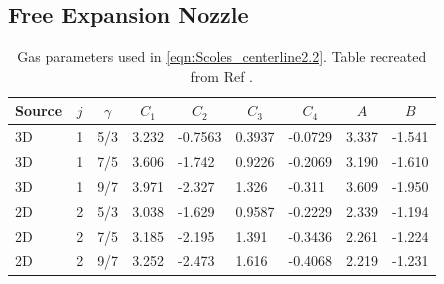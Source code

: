 \subsection{Free Expansion Nozzle}
%

\begin{table}[]
	\centering
	\begin{tabular}{lllllllll}
		\hline
		\multicolumn{1}{c}{Source} & \multicolumn{1}{c}{$j$} & \multicolumn{1}{c}{$\gamma$} & \multicolumn{1}{c}{$C_1$} & \multicolumn{1}{c}{$C_2$} & \multicolumn{1}{c}{$C_3$} & \multicolumn{1}{c}{$C_4$} & \multicolumn{1}{c}{$A$} & \multicolumn{1}{c}{$B$} \\ \hline
		3D                         & 1                     & 5/3                          & 3.232                     & -0.7563                   & 0.3937                    & -0.0729                   & 3.337                & -1.541                \\
		3D                         & 1                     & 7/5                          & 3.606                     & -1.742                    & 0.9226                    & -0.2069                   & 3.190                 & -1.610                \\
		3D                         & 1                     & 9/7                          & 3.971                     & -2.327                    & 1.326                     & -0.311                    & 3.609                 & -1.950                \\
		2D                         & 2                     & 5/3                          & 3.038                     & -1.629                    & 0.9587                    & -0.2229                   & 2.339                 & -1.194                \\
		2D                         & 2                     & 7/5                          & 3.185                     & -2.195                    & 1.391                     & -0.3436                   & 2.261                 & -1.224                \\
		2D                         & 2                     & 9/7                          & 3.252                     & -2.473                    & 1.616                     & -0.4068                   & 2.219                 & -1.231               
	\end{tabular}
	\caption{Gas parameters used in \cref{eqn:Scoles_centerline2.2}. Table recreated from Ref \cite{millerFreeJetSources1988}.}
	\label{tbl:Scoles_gas_params2.2}
\end{table}

